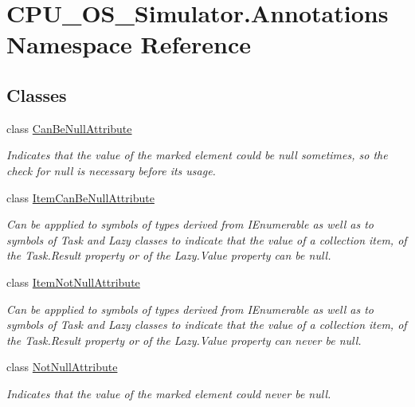 \hypertarget{namespace_c_p_u___o_s___simulator_1_1_annotations}{}\section{C\+P\+U\+\_\+\+O\+S\+\_\+\+Simulator.\+Annotations Namespace Reference}
\label{namespace_c_p_u___o_s___simulator_1_1_annotations}
\subsection*{Classes}
\begin{DoxyCompactItemize}
\item 
class \hyperlink{class_c_p_u___o_s___simulator_1_1_annotations_1_1_can_be_null_attribute}{Can\+Be\+Null\+Attribute}
\begin{DoxyCompactList}\small\item\em Indicates that the value of the marked element could be {\ttfamily null} sometimes, so the check for {\ttfamily null} is necessary before its usage. \end{DoxyCompactList}\item 
class \hyperlink{class_c_p_u___o_s___simulator_1_1_annotations_1_1_item_can_be_null_attribute}{Item\+Can\+Be\+Null\+Attribute}
\begin{DoxyCompactList}\small\item\em Can be appplied to symbols of types derived from I\+Enumerable as well as to symbols of Task and Lazy classes to indicate that the value of a collection item, of the Task.\+Result property or of the Lazy.\+Value property can be null. \end{DoxyCompactList}\item 
class \hyperlink{class_c_p_u___o_s___simulator_1_1_annotations_1_1_item_not_null_attribute}{Item\+Not\+Null\+Attribute}
\begin{DoxyCompactList}\small\item\em Can be appplied to symbols of types derived from I\+Enumerable as well as to symbols of Task and Lazy classes to indicate that the value of a collection item, of the Task.\+Result property or of the Lazy.\+Value property can never be null. \end{DoxyCompactList}\item 
class \hyperlink{class_c_p_u___o_s___simulator_1_1_annotations_1_1_not_null_attribute}{Not\+Null\+Attribute}
\begin{DoxyCompactList}\small\item\em Indicates that the value of the marked element could never be {\ttfamily null}. \end{DoxyCompactList}\end{DoxyCompactItemize}
